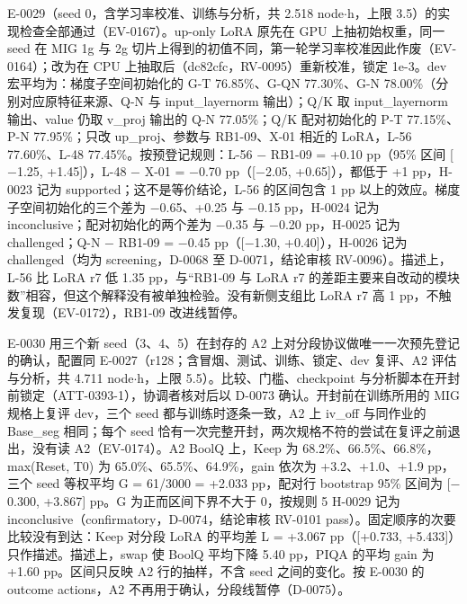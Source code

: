 \documentclass[11pt]{article}
\begin{document}
E-0029（seed 0，含学习率校准、训练与分析，共 2.518 node$\cdot$h，上限 3.5）的实现检查全部通过（EV-0167）。up-only LoRA 原先在 GPU 上抽初始权重，同一 seed 在 MIG 1g 与 2g 切片上得到的初值不同，第一轮学习率校准因此作废（EV-0164）；改为在 CPU 上抽取后（dc82cfc，RV-0095）重新校准，锁定 1e-3。dev 宏平均为：梯度子空间初始化的 G-T 76.85\%、G-QN 77.30\%、G-N 78.00\%（分别对应原特征来源、Q-N 与 input\_layernorm 输出）；Q/K 取 input\_layernorm 输出、value 仍取 v\_proj 输出的 Q-N 77.05\%；Q/K 配对初始化的 P-T 77.15\%、P-N 77.95\%；只改 up\_proj、参数与 RB1-09、X-01 相近的 LoRA，L-56 77.60\%、L-48 77.45\%。按预登记规则：L-56 $-$ RB1-09 = +0.10 pp（95\% 区间 [$-$1.25, +1.45]），L-48 $-$ X-01 = $-$0.70 pp（[$-$2.05, +0.65]），都低于 +1 pp，H-0023 记为 supported；这不是等价结论，L-56 的区间包含 1 pp 以上的效应。梯度子空间初始化的三个差为 $-$0.65、+0.25 与 $-$0.15 pp，H-0024 记为 inconclusive；配对初始化的两个差为 $-$0.35 与 $-$0.20 pp，H-0025 记为 challenged；Q-N $-$ RB1-09 = $-$0.45 pp（[$-$1.30, +0.40]），H-0026 记为 challenged（均为 screening，D-0068 至 D-0071，结论审核 RV-0096）。描述上，L-56 比 LoRA r7 低 1.35 pp，与``RB1-09 与 LoRA r7 的差距主要来自改动的模块数''相容，但这个解释没有被单独检验。没有新侧支组比 LoRA r7 高 1 pp，不触发复现（EV-0172），RB1-09 改进线暂停。

E-0030 用三个新 seed（3、4、5）在封存的 A2 上对分段协议做唯一一次预先登记的确认，配置同 E-0027（r128；含冒烟、测试、训练、锁定、dev 复评、A2 评估与分析，共 4.711 node$\cdot$h，上限 5.5）。比较、门槛、checkpoint 与分析脚本在开封前锁定（ATT-0393-1），协调者核对后以 D-0073 确认。开封前在训练所用的 MIG 规格上复评 dev，三个 seed 都与训练时逐条一致，A2 上 iv\_off 与同作业的 Base\_seg 相同；每个 seed 恰有一次完整开封，两次规格不符的尝试在复评之前退出，没有读 A2（EV-0174）。A2 BoolQ 上，Keep 为 68.2\%、66.5\%、66.8\%，max(Reset, T0) 为 65.0\%、65.5\%、64.9\%，gain 依次为 +3.2、+1.0、+1.9 pp，三个 seed 等权平均 G = 61/3000 = +2.033 pp，配对行 bootstrap 95\% 区间为 [$-$0.300, +3.867] pp。G 为正而区间下界不大于 0，按规则 5 H-0029 记为 inconclusive（confirmatory，D-0074，结论审核 RV-0101 pass）。固定顺序的次要比较没有到达：Keep 对分段 LoRA 的平均差 L = +3.067 pp（[+0.733, +5.433]）只作描述。描述上，swap 使 BoolQ 平均下降 5.40 pp，PIQA 的平均 gain 为 +1.60 pp。区间只反映 A2 行的抽样，不含 seed 之间的变化。按 E-0030 的 outcome actions，A2 不再用于确认，分段线暂停（D-0075）。
\end{document}
